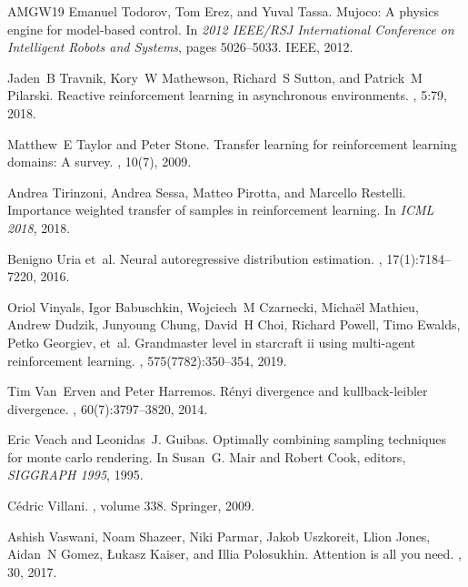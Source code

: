 \begin{thebibliography}{AMGW{\etalchar{+}}19}
Emanuel Todorov, Tom Erez, and Yuval Tassa.
\newblock Mujoco: A physics engine for model-based control.
\newblock In {\em 2012 IEEE/RSJ International Conference on Intelligent Robots and Systems}, pages 5026--5033. IEEE, 2012.

Jaden~B Travnik, Kory~W Mathewson, Richard~S Sutton, and Patrick~M Pilarski.
\newblock Reactive reinforcement learning in asynchronous environments.
, 5:79, 2018.

Matthew~E Taylor and Peter Stone.
\newblock Transfer learning for reinforcement learning domains: A survey.
, 10(7), 2009.

Andrea Tirinzoni, Andrea Sessa, Matteo Pirotta, and Marcello Restelli.
\newblock Importance weighted transfer of samples in reinforcement learning.
\newblock In {\em ICML 2018}, 2018.

Benigno Uria et~al.
\newblock Neural autoregressive distribution estimation.
, 17(1):7184--7220, 2016.

Oriol Vinyals, Igor Babuschkin, Wojciech~M Czarnecki, Micha{\"e}l Mathieu, Andrew Dudzik, Junyoung Chung, David~H Choi, Richard Powell, Timo Ewalds, Petko Georgiev, et~al.
\newblock Grandmaster level in starcraft ii using multi-agent reinforcement learning.
, 575(7782):350--354, 2019.

Tim Van~Erven and Peter Harremos.
\newblock R{\'e}nyi divergence and kullback-leibler divergence.
, 60(7):3797--3820, 2014.

Eric Veach and Leonidas~J. Guibas.
\newblock Optimally combining sampling techniques for monte carlo rendering.
\newblock In Susan~G. Mair and Robert Cook, editors, {\em SIGGRAPH 1995}, 1995.

C{\'e}dric Villani.
, volume 338.
\newblock Springer, 2009.

Ashish Vaswani, Noam Shazeer, Niki Parmar, Jakob Uszkoreit, Llion Jones, Aidan~N Gomez, {\L}ukasz Kaiser, and Illia Polosukhin.
\newblock Attention is all you need.
, 30, 2017.


\end{thebibliography}
